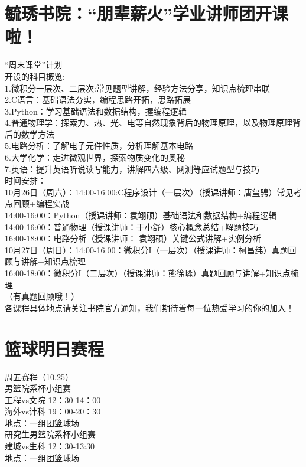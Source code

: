 \documentclass[letterpaper, 12pt]{article}
\begin{document}
\begin{multicols}{2}
\section{毓琇书院：“朋辈薪火”学业讲师团开课啦！}
“周末课堂”计划\\
开设的科目概览:\\
1.微积分一层次、二层次:常见题型讲解，经验方法分享，知识点梳理串联\\
2.C语言：基础语法夯实，编程思路开拓，思路拓展\\
3.Python：学习基础语法和数据结构，握编程逻辑\\
4.普通物理学：探索力、热、光、电等自然现象背后的物理原理，以及物理原理背后的数学方法\\
5.电路分析：了解电子元件性质，分析理解基本电路\\
6.大学化学：走进微观世界，探索物质变化的奥秘\\
7.英语：提升英语听说读写能力，讲解四六级、网测等应试题型与技巧\\
时间安排：\\
10月26日（周六）：14:00-16:00:C程序设计（一层次）（授课讲师：唐玺骋）常见考点回顾+编程实战\\
14:00-16:00：Python（授课讲师：袁翊硕）基础语法和数据结构+编程逻辑\\
14:00-16:00：普通物理（授课讲师：于小舒）核心概念总结+解题技巧\\
16:00-18:00：电路分析（授课讲师： 袁翊硕）关键公式讲解+实例分析\\
10月27日（周日）：14:00-16:00：微积分I（一层次）（授课讲师：柯昌纬）真题回顾与讲解+知识点梳理\\
16:00-18:00：微积分I（二层次）（授课讲师：熊徐琢）真题回顾与讲解+知识点梳理\\
（有真题回顾哦！）\\
各课程具体地点请关注书院官方通知，我们期待着每一位热爱学习的你的加入！\\

\section{篮球明日赛程}
周五赛程（10.25）\\
男篮院系杯小组赛\\
工程vs文院 12：30-14：00\\
海外vs计科 19：00-20：30\\
地点：一组团篮球场\\
研究生男篮院系杯小组赛\\
建城vs生科 12：30-13:30\\
地点：一组团篮球场

\end{multicols}
\end{document}
